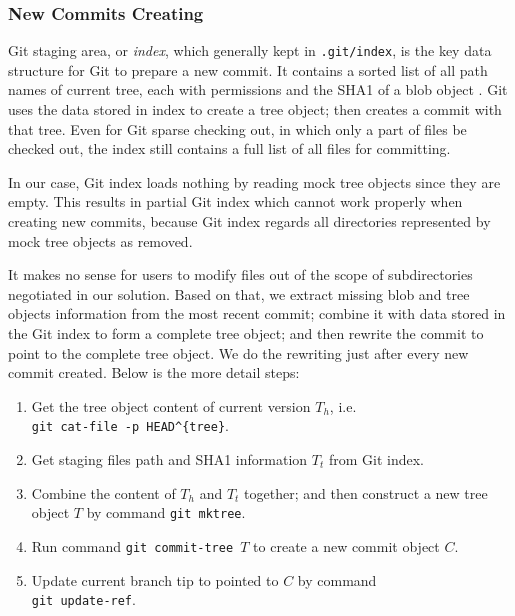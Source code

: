 \documentclass[preprint]{sigplanconf}
\begin{document}
\subsubsection{New Commits Creating}\label{sec:create-new-commit}
Git staging area, or \emph{index}, which generally kept in \verb|.git/index|,
is the key data structure for Git to prepare a new commit.
It contains a sorted list of all path names of current tree, each with
permissions and the SHA1 of a blob object \cite{idx-format}.
Git uses the data stored in index to create a tree object; then creates a
commit with that tree.
Even for Git sparse checking out, in which only a part of files be checked
out, the index still contains a full list of all files for committing.

In our case, Git index loads nothing by reading mock tree objects
since they are empty.
This results in partial Git index which cannot work properly when creating new
commits, because Git index regards all directories represented by mock tree
objects as removed.

It makes no sense for users to modify files out of the scope of
subdirectories negotiated in our solution.
Based on that, we extract missing blob and tree objects information from the
most recent commit; combine it with data stored in the Git index to form a
complete tree object; and then rewrite the commit to point to the complete tree
object.
We do the rewriting just after every new commit created.
Below is the more detail steps:

\begin{enumerate}
  \item Get the tree object content of current version $T_h$, i.e. \\
        \verb|git cat-file -p HEAD^{tree}|.

  \item Get staging files path and SHA1 information $T_t$ from Git index.

  \item Combine the content of $T_h$ and $T_t$ together; and then construct a
        new tree object $T$ by command \verb|git mktree|.

  \item Run command \verb|git commit-tree |$T$ to create a new commit object
        $C$.

  \item Update current branch tip to pointed to $C$ by command \\
        \verb|git update-ref|.
\end{enumerate}
\end{document}
